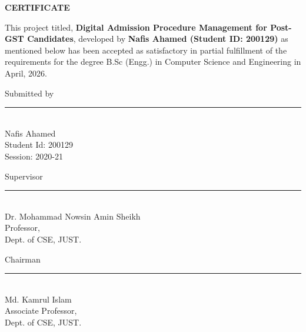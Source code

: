 \newpage
\begin{center}
    \Large \textbf{CERTIFICATE}
\end{center}
\vspace{1.5cm}

This project titled, \textbf{Digital Admission Procedure Management for Post-GST Candidates}, developed by \textbf{Nafis Ahamed (Student ID: 200129)} as mentioned below has been accepted as satisfactory in partial fulfillment of the requirements for the degree B.Sc (Engg.) in Computer Science and Engineering in April, 2026.

\vspace{3cm}

\noindent
\begin{minipage}[t]{0.45\textwidth}
    {Submitted by}
    \vspace{2cm}
    
    \rule{5cm}{0.4pt} \\
    Nafis Ahamed \\
    Student Id: 200129 \\
    Session: 2020-21
\end{minipage}
\hfill
\begin{minipage}[t]{0.45\textwidth}
    {Supervisor}
    \vspace{2cm}
    
    \rule{5cm}{0.4pt} \\
    Dr. Mohammad Nowsin Amin Sheikh \\
    Professor, \\
    Dept. of CSE, JUST.
\end{minipage}

\vspace{4cm}

\begin{center}
    {Chairman}
    \vspace{2cm}
    
    \rule{5cm}{0.4pt} \\
    Md. Kamrul Islam \\
    Associate Professor, \\
    Dept. of CSE, JUST.
\end{center}
